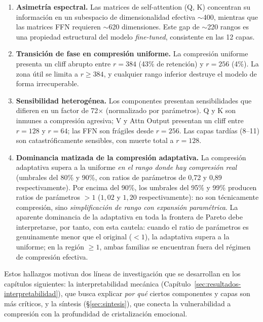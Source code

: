 \begin{enumerate}[nosep]
    \item \textbf{Asimetría espectral.} Las matrices de self-attention (Q, K) concentran
    su información en un subespacio de dimensionalidad efectiva $\sim$400, mientras que
    las matrices FFN requieren $\sim$620 dimensiones. Este gap de $\sim$220 rangos es
    una propiedad estructural del modelo \emph{fine-tuned}, consistente en las 12 capas.

    \item \textbf{Transición de fase en compresión uniforme.} La compresión uniforme
    presenta un cliff abrupto entre $r=384$ (43\% de retención) y $r=256$ (4\%).
    La zona útil se limita a $r \geq 384$, y cualquier rango inferior destruye el
    modelo de forma irrecuperable.

    \item \textbf{Sensibilidad heterogénea.} Los componentes presentan sensibilidades
    que difieren en un factor de 72$\times$ (normalizado por parámetros). Q y K son
    inmunes a compresión agresiva; V y Attn Output presentan un cliff entre $r=128$ y
    $r=64$; las FFN son frágiles desde $r=256$. Las capas tardías (8--11) son
    catastróficamente sensibles, con muerte total a $r=128$.

    \item \textbf{Dominancia matizada de la compresión adaptativa.} La
    compresión adaptativa supera a la uniforme \emph{en el rango donde hay
    compresión real} (umbrales del 80\% y 90\%, con ratios de parámetros
    de 0{,}72 y 0{,}89 respectivamente). Por encima del 90\%, los umbrales
    del 95\% y 99\% producen ratios de parámetros $>1$ ($1{,}02$ y
    $1{,}20$ respectivamente): no son técnicamente compresión, sino
    \emph{simplificación de rango con expansión paramétrica}. La aparente
    dominancia de la adaptativa en toda la frontera de Pareto debe
    interpretarse, por tanto, con esta cautela: cuando el ratio de
    parámetros es genuinamente menor que el original ($<1$), la adaptativa
    supera a la uniforme; en la región $\geq 1$, ambas familias se
    encuentran fuera del régimen de compresión efectiva.
\end{enumerate}

Estos hallazgos motivan dos líneas de investigación que se desarrollan en los capítulos
siguientes: la interpretabilidad mecánica (Capítulo~\ref{sec:resultados-interpretabilidad}),
que busca explicar \emph{por qué} ciertos componentes y capas son más críticos, y la
síntesis (\S\ref{sec:sintesis}), que conecta la vulnerabilidad a compresión con la
profundidad de cristalización emocional.